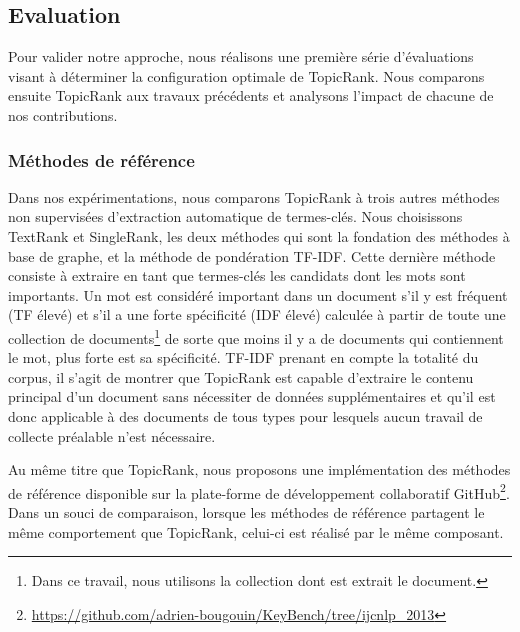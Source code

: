     \subsection{Evaluation}
    \label{subsec:main-automatic_keyphrase_annotation-unsupervised_automatic_keyphrase_extraction-evaluation}
      Pour valider notre approche, nous réalisons une première série
      d'évaluations visant à déterminer la configuration optimale de TopicRank.
      Nous comparons  ensuite Topic\-Rank aux travaux précédents et analysons
      l'impact de chacune de nos contributions.
      
      \subsubsection{Méthodes de référence}
      \label{subsubsec:main-automatic_keyphrase_annotation-unsupervised_automatic_keyphrase_extraction-evaluation-baselines}
        Dans nos expérimentations, nous comparons TopicRank à trois autres
        méthodes non supervisées d'extraction automatique de termes-clés. Nous
        choisissons TextRank et SingleRank, les deux méthodes qui sont la
        fondation des méthodes à base de graphe, et la méthode de pondération
        TF-IDF. Cette dernière méthode consiste à extraire en tant que
        termes-clés les candidats dont les mots sont importants. Un mot est
        considéré important dans un document s'il y est fréquent (TF élevé) et
        s'il a une forte spécificité (IDF élevé) calculée à partir de toute une
        collection de documents\footnote{Dans ce travail, nous utilisons la
        collection dont est extrait le document.} de sorte que moins il y a de
        documents qui contiennent le mot, plus forte est sa spécificité. TF-IDF
        prenant en compte la totalité du corpus, il s'agit de montrer que
        TopicRank est capable d'extraire le contenu principal d'un document sans
        nécessiter de données supplémentaires et qu'il est donc applicable à des
        documents de tous types pour lesquels aucun travail de collecte
        préalable n'est nécessaire.

        Au même titre que TopicRank, nous proposons une implémentation des
        méthodes de référence disponible sur la plate-forme de développement
        collaboratif
        GitHub\footnote{\url{https://github.com/adrien-bougouin/KeyBench/tree/ijcnlp_2013}}.
        Dans un souci de comparaison, lorsque les méthodes de référence
        partagent le même comportement que TopicRank, celui-ci est réalisé par
        le même composant.

